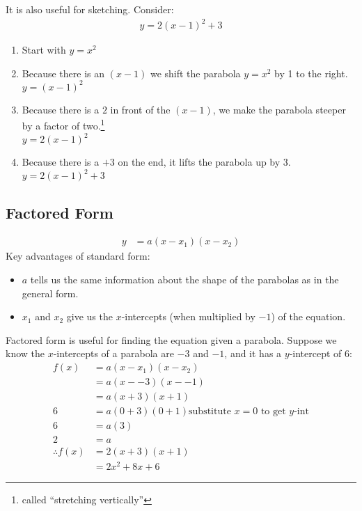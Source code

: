 It is also useful for sketching. Consider:
\begin{align}
  y = 2(x-1)^{2} + 3
\end{align}
\begin{enumerate}
  \item Start with $y = x^2$
  
  \item Because there is an $(x - 1)$ we shift the parabola $y = x^2$ by 1 to
  the right.\\
  $y = (x - 1)^2$
  
  \item Because there is a $2$ in front of the $(x-1)$, we make the parabola
  steeper by a factor of two.\footnote{called ``stretching vertically''} \\
  $y = 2(x - 1)^2$
  
  \item Because there is a $+3$ on the end, it lifts the parabola up by 3. \\
  $y = 2(x - 1)^2 +3$
\end{enumerate}

\subsection{Factored Form}
\begin{align}
  y & = a(x - x_1)(x - x_2) \nonumber
\end{align}
Key advantages of standard form:
\begin{itemize}
  \item $a$ tells us the same information about the shape of the parabolas as in
  the general form.
  \item $x_1$ and $x_2$ give us the $x$-intercepts (when multiplied by $-1$) of
  the equation.
\end{itemize}
Factored form is useful for finding the equation given a parabola. Suppose we
know the $x$-intercepts of a parabola are $-3$ and $-1$, and it has a
$y$-intercept of 6:
\begin{align}
  f(x) & = a(x - x_1)(x - x_2) \\
       & = a(x - -3)(x - -1) \\
       & = a(x +3)(x + 1) \\
     6 & = a(0 + 3)(0 + 1) \text{substitute $x=0$ to get $y$-int} \\
     6 & = a(3) \\
     2 & = a \\
     \therefore f(x) & = 2(x+3)(x+1) \\
     & = 2x^2 + 8x + 6 
\end{align}


